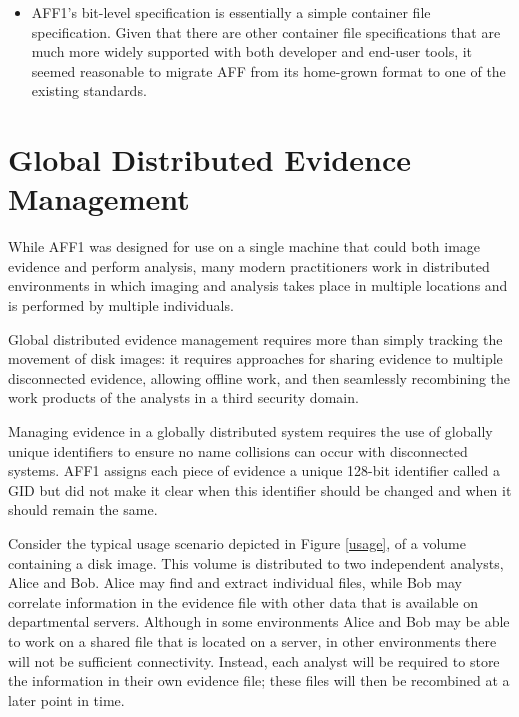 \documentclass[10pt, conference]{IEEEtran}
\begin{document}
\begin{itemize}


\item AFF1's bit-level specification is essentially a simple container
  file specification. Given that there are other container file
  specifications that are much more widely supported with both
  developer and end-user tools, it seemed reasonable to migrate AFF
  from its home-grown format to one of the existing standards.

\end{itemize}

\section{Global Distributed Evidence Management}
While AFF1 was designed for use on a single machine that could both
image evidence and perform analysis, many modern practitioners work in
distributed environments in which imaging and analysis takes place in
multiple locations and is performed by multiple individuals. 


Global distributed evidence management requires more than simply
tracking the movement of disk images: it requires approaches for
sharing evidence to multiple disconnected evidence, allowing offline
work, and then seamlessly recombining the work products of the
analysts in a third security domain.

Managing evidence in a globally distributed system requires the use of
globally unique identifiers to ensure no name collisions can occur
with disconnected systems. AFF1 assigns each piece of evidence a
unique 128-bit identifier called a GID but did not make it clear when
this identifier should be changed and when it should remain the same.

Consider the typical usage scenario depicted in Figure \ref{usage}, of
a volume containing a disk image. This volume is distributed to two
independent analysts, Alice and Bob. Alice may find and extract
individual files, while Bob may correlate information in the evidence
file with other data that is available on departmental
servers. Although in some environments Alice and Bob may be able to
work on a shared file that is located on a server, in other
environments there will not be sufficient connectivity. Instead, each
analyst will be required to store the information in their own
evidence file; these files will then be recombined at a later point in
time.
\end{document}

